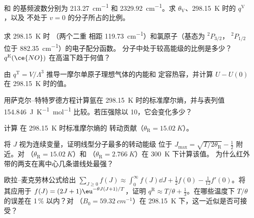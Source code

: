 \begin{exercise}[$\star\star$]\label{exo:b3:partition-functions:5}
 和  的基频波数分别为 \qty{213.27}{cm^{-1}} 和
\qty{2329.92}{cm^{-1}}。求 $\theta_{\mathrm V}$、\qty{298.15}{K} 时的 $q^{\mathrm V}$，以及
不处于 $v = 0$ 的分子所占的比例。
\end{exercise}

\begin{exercise}[$\star\star$]\label{exo:b3:partition-functions:6}
求 \qty{298.15}{K} 时 （两个二重
相距 \qty{119.73}{cm^{-1}}）和氯原子（基态为 ${}^2P_{3/2}$，
${}^2P_{1/2}$ 位于 \qty{882.35}{cm^{-1}}）的电子配分函数。 分子中处于较高能级的比例是多少？
$q^{\mathrm E}(\ce{NO})$ 在高温下趋于何值？
\end{exercise}

\begin{exercise}[$\star\star$]\label{exo:b3:partition-functions:7}
由 $q^{\mathrm T} = V/\Lambda^3$ 推导一摩尔单原子理想气体的内能和
定容热容，并计算 $U - U(0)$ 在
\qty{298.15}{K} 时的值。
\end{exercise}

\begin{exercise}[$\star\star$]\label{exo:b3:partition-functions:8}
用萨克尔–特特罗德方程计算氩在
\qty{298.15}{K} 时的标准摩尔熵，并与表列值
\qty{154.846}{J.K^{-1}.mol^{-1}} 比较。若压强除以 10，它会变化多少？
\end{exercise}

\begin{exercise}[$\star\star$]\label{exo:b3:partition-functions:9}
计算  在 \qty{298.15}{K} 时标准摩尔熵的
转动贡献（$\theta_{\mathrm R} = \qty{15.02}{K}$）。
\end{exercise}

\begin{exercise}[$\star\star\star$]\label{exo:b3:partition-functions:10}
将 $J$ 视为连续变量，证明线型分子最多的转动能级
位于 $J_{\max} = \sqrt{T/2\theta_{\mathrm R}} - \frac12$ 附近。对 
（$\theta_{\mathrm R} = \qty{15.02}{K}$）和 （$\theta_{\mathrm R} = \qty{2.766}{K}$）在 \qty{300}{K} 下计算该值。
为什么红外带的两支在离中心几条谱线处最强？
\end{exercise}

\begin{exercise}[$\star\star\star$]\label{exo:b3:partition-functions:11}
欧拉–麦克劳林公式给出 $\sum_{J\ge0}f(J) \approx \int_0^\infty f(J)\dd J + \frac12f(0) -
\frac1{12}f'(0)$。将其应用于 $f(J) = (2J+1)\eu^{-\theta J(J+1)/T}$，证明 $q^{\mathrm R} \approx T/\theta +
\frac13$。在哪些温度下 $T/\theta$ 的误差在 1\,\% 以内？对 
（$B_0 = \qty{59.32}{cm^{-1}}$）在 \qty{298.15}{K} 下，这一近似是否可接受？
\end{exercise}

